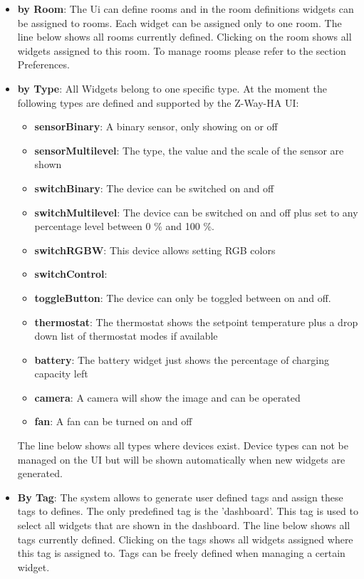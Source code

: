\begin{itemize}
\item \textbf{by Room}:  The Ui can define rooms and in the room definitions widgets
can be assigned to rooms. Each widget can be assigned only to one room. The line below shows
all rooms currently defined. Clicking on the room shows all widgets assigned to this room. 
To manage rooms please refer to the section Preferences.
\item \textbf{by Type}:  All Widgets belong to one specific type. At the moment the following
types are defined and supported by the Z-Way-HA UI:
\begin{itemize}
\item \textbf{sensorBinary}: A binary sensor, only showing on or off
\item \textbf{sensorMultilevel}: The type, the value and the scale of the sensor are shown
\item \textbf{switchBinary}: The device can be switched on and off
\item \textbf{switchMultilevel}: The device can be switched on and off plus set to any
percentage level between 0 \% and 100 \%.
\item \textbf{switchRGBW}: This device allows setting RGB colors
\item \textbf{switchControl}:
\item \textbf{toggleButton}: The device can only be toggled between on and off.
\item \textbf{thermostat}: The thermostat shows the setpoint temperature plus a drop 
down list of thermostat modes if available
\item \textbf{battery}: The battery widget just shows the percentage of charging capacity left
\item \textbf{camera}: A camera will show the image and can be operated
\item \textbf{fan}: A fan can be turned on and off
\end{itemize}
The line below shows
all types where devices exist. Device types can not be managed on the UI but will be shown
automatically when new widgets are generated.
\item \textbf{By Tag}:  The system allows to generate user defined tags and assign 
these tags to defines. The only predefined tag is the 'dashboard'. This tag is used to 
select all widgets that are shown in the dashboard.
The line below shows all tags currently defined. Clicking on the tags shows all 
widgets assigned where this tag is assigned to. Tags can be freely defined when managing
a certain widget.
\end{itemize}

